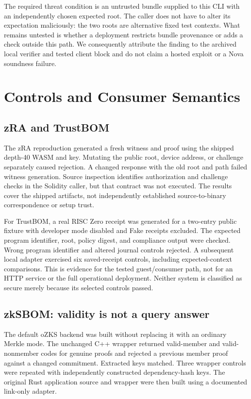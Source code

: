 \documentclass[sigconf,nonacm]{acmart}
\begin{document}
The required threat condition is an untrusted bundle supplied to this CLI with an independently chosen expected root. The caller does not have to alter its expectation maliciously: the two roots are alternative fixed test contexts. What remains untested is whether a deployment restricts bundle provenance or adds a check outside this path. We consequently attribute the finding to the archived local verifier and tested client block and do not claim a hosted exploit or a Nova soundness failure.

\section{Controls and Consumer Semantics}
\subsection{zRA and TrustBOM}
The zRA reproduction generated a fresh witness and proof using the shipped depth-40 WASM and key. Mutating the public root, device address, or challenge separately caused rejection. A changed response with the old root and path failed witness generation. Source inspection identifies authorization and challenge checks in the Solidity caller, but that contract was not executed. The results cover the shipped artifacts, not independently established source-to-binary correspondence or setup trust.

For TrustBOM, a real RISC Zero receipt was generated for a two-entry public fixture with developer mode disabled and Fake receipts excluded. The expected program identifier, root, policy digest, and compliance output were checked. Wrong program identifier and altered journal controls rejected. A subsequent local adapter exercised six saved-receipt controls, including expected-context comparisons. This is evidence for the tested guest/consumer path, not for an HTTP service or the full operational deployment. Neither system is classified as secure merely because its selected controls passed.

\subsection{zkSBOM: validity is not a query answer}
The default oZKS backend was built without replacing it with an ordinary Merkle mode. The unchanged C++ wrapper returned valid-member and valid-nonmember codes for genuine proofs and rejected a previous member proof against a changed commitment. Extracted keys matched. Three wrapper controls were repeated with independently constructed dependency-hash keys. The original Rust application source and wrapper were then built using a documented link-only adapter.
\end{document}
